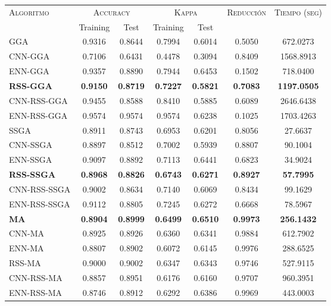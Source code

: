 \begin{table}[h!]
\centering
\begin{tabular}{l c c c c c c}
\hline
\multirow{2}{*}{\textsc{Algoritmo}}
	& \multicolumn{2}{c}{\textsc{Accuracy}}
	& \multicolumn{2}{c}{\textsc{Kappa}}
	& \textsc{Reducción}
	& \textsc{Tiempo (seg)} \\
	& Training & Test
	& Training & Test \\ 
\hline
\hline

GGA         & 0.9316 & 0.8644 & 0.7994 & 0.6014 & 0.5050 & 672.0273 \\
CNN-GGA     & 0.7106 & 0.6431 & 0.4478 & 0.3094 & 0.8409 & 1568.8913 \\
ENN-GGA     & 0.9357 & 0.8890 & 0.7944 & 0.6453 & 0.1502 & 718.0400 \\
\textbf{RSS-GGA}     & \textbf{0.9150} & \textbf{0.8719} & \textbf{0.7227} & \textbf{0.5821} & \textbf{0.7083} & \textbf{1197.0505} \\
CNN-RSS-GGA & 0.9455 & 0.8588 & 0.8410 & 0.5885 & 0.6089 & 2646.6438 \\
ENN-RSS-GGA & 0.9574 & 0.9574 & 0.9574 & 0.6238 & 0.1025 & 1703.4263 \\

\hline

SSGA & 0.8911 & 0.8743 & 0.6953 & 0.6201 & 0.8056 & 27.6637 \\
CNN-SSGA & 0.8897 & 0.8512 & 0.7002 & 0.5939 & 0.8807 & 90.1004 \\
ENN-SSGA & 0.9097 & 0.8892 & 0.7113 & 0.6441 & 0.6823 & 34.9024 \\
\textbf{RSS-SSGA} & \textbf{0.8968} & \textbf{0.8826} & \textbf{0.6743} & \textbf{0.6271} & \textbf{0.8927} & \textbf{57.7995} \\
CNN-RSS-SSGA & 0.9002 & 0.8634 & 0.7140 & 0.6069 & 0.8434 & 99.1629 \\
ENN-RSS-SSGA & 0.9112 & 0.8805 & 0.7245 & 0.6272 & 0.6668 & 78.5967 \\

\hline

\textbf{MA}   & \textbf{0.8904} & \textbf{0.8999} & \textbf{0.6499} & \textbf{0.6510} & \textbf{0.9973} & \textbf{256.1432} \\
CNN-MA & 0.8925 & 0.8926 & 0.6360 & 0.6341 & 0.9884 & 612.7902 \\
ENN-MA & 0.8807 & 0.8902 & 0.6072 & 0.6145 & 0.9976 & 288.6525 \\
RSS-MA & 0.9000 & 0.9002 & 0.6347 & 0.6343 & 0.9746 & 527.9115 \\
CNN-RSS-MA & 0.8857 & 0.8951 & 0.6176 & 0.6160 & 0.9707 & 960.3951 \\
ENN-RSS-MA & 0.8746 & 0.8912 & 0.6292 & 0.6386 & 0.9969 & 443.0003 \\


\end{tabular}
\end{table}
